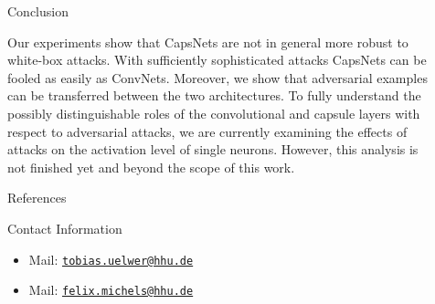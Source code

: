 \documentclass[final]{beamer}
\newlength{\sepwid}
\newlength{\onecolwid}
\newlength{\twocolwid}
\begin{document}
\begin{frame}[t]
\begin{columns}[t]
\begin{column}{\twocolwid}
		\end{column} 
		
		\begin{column}{\sepwid}\end{column} %
		
		\begin{column}{\onecolwid} %
			
			\begin{block}{Conclusion}
				
				Our experiments show that CapsNets are not in general more robust to
				white-box attacks. With sufficiently sophisticated attacks CapsNets
				can be fooled as easily as ConvNets.  Moreover, we show that adversarial examples can be transferred between the two architectures. To fully understand the possibly distinguishable roles of the convolutional and capsule layers with respect to adversarial attacks, we are currently examining the effects of attacks on the activation level of single neurons.  However, this analysis is not finished yet and beyond the scope of this work.
				
			\end{block}
			
			\begin{block}{References}
				
				\tiny{
					\vspace{0.75in}}
				
			\end{block}
			
			
			
			\begin{alertblock}{Contact Information}
				
				\begin{itemize}
					\item Mail: \texttt{\href{mailto:tobias.uelwer@hhu.de}{tobias.uelwer@hhu.de}  }
					\item Mail: \texttt{\href{mailto:felix.michels@hhu.de}{felix.michels@hhu.de}}
				\end{itemize}
				

\end{alertblock}
\end{column}
\end{columns}
\end{frame}
\end{document}
